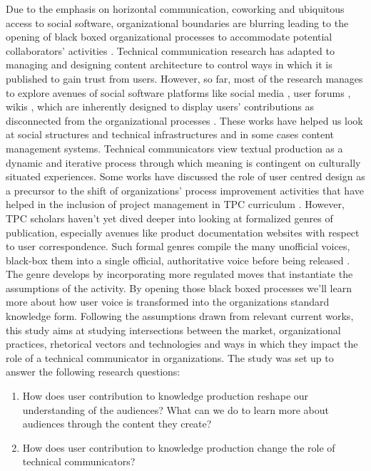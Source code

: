 Due to the emphasis on horizontal communication, coworking and ubiquitous access to social software, organizational boundaries are blurring leading to the opening of black boxed organizational processes to accommodate potential collaborators’ activities \cite{spinuzzi2009starter}. Technical communication research has adapted to managing and designing content architecture to control ways in which it is published to gain trust from users. However, so far, most of the research manages to explore avenues of social software platforms like social media \cite{spinuzzi2009starter}, user forums \cite{spinuzzi2000investigating, paretti2007teaching, slattery2007undistributing, swarts2007mobility}, wikis \cite{jones2008patterns, swarts2007mobility, slattery2009edit}, which are inherently designed to display users' contributions as disconnected from the organizational processes \cite{grabill2003divides, harrison2003methodological, spinuzzi2003open, zappen2006developing, swarts2007mobility, andersen2011component, potts2019boycotting}. These works have helped us look at social structures and technical infrastructures and in some cases content management systems. Technical communicators view textual production as a dynamic and iterative process through which meaning is contingent on culturally situated experiences. Some works have discussed the role of user centred design as a precursor to the shift of organizations' process improvement activities that have helped in the inclusion of project management in TPC curriculum \cite{hart2007coming, dicks2000paradox, lauren2018communicating}. However, TPC scholars haven't yet dived deeper into looking at formalized genres of publication, especially avenues like product documentation websites with respect to user correspondence. Such formal genres compile the many unofficial voices, black-box them \cite{latour1987science} into a single official, authoritative voice before being released \cite{spinuzzi2009starter}. The genre develops by incorporating more regulated moves that instantiate the assumptions of the activity. By opening those black boxed processes we'll learn more about how user voice is transformed into the organizations standard knowledge form. Following the assumptions drawn from relevant current works, this study aims at studying intersections between the market, organizational practices, rhetorical vectors and technologies and ways in which they impact the role of a technical communicator in organizations. The study was set up to answer the following research questions:

\begin{enumerate}
  \item How does user contribution to knowledge production reshape our understanding of the audiences? What can we do to learn more about audiences through the content they create? 
    \item How does user contribution to knowledge production change the role of technical communicators?
\end{enumerate}

